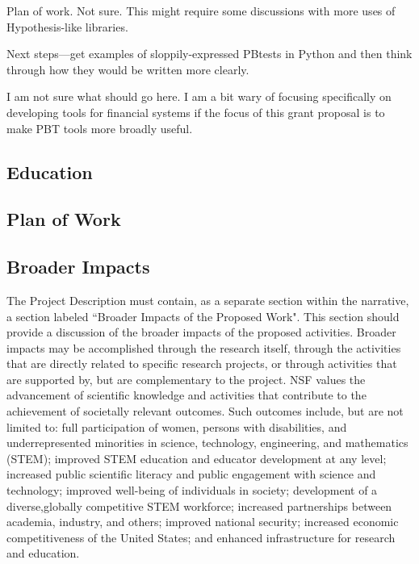 Plan of work. Not sure. This might require some discussions with more uses of Hypothesis-like libraries.

Next steps—get examples of sloppily-expressed PBtests in Python and then think through how they would be written more clearly.




I am not sure what should go here. I am a bit wary of focusing specifically on developing tools for financial systems if the focus of this grant proposal is to make PBT tools more broadly useful.

\subsection{Education }

\subsection{Plan of Work }

\subsection{Broader Impacts }
The Project Description must contain, as a separate section within the narrative, a section labeled ``Broader
Impacts of the Proposed Work". This section should provide a discussion of the broader impacts of the proposed
activities. Broader impacts may be accomplished through the research itself, through the activities that are
directly related to specific research projects, or through activities that are supported by, but are complementary to
the project. NSF values the advancement of scientific knowledge and activities that contribute to the
achievement of societally relevant outcomes. Such outcomes include, but are not limited to: full
participation of women, persons with disabilities, and underrepresented minorities in science, technology, engineering, and
mathematics (STEM); improved STEM education and educator development at any level; increased public
scientific literacy and public engagement with science and technology; improved well-being of individuals in
society; development of a diverse,globally competitive STEM workforce; increased partnerships between
academia, industry, and others; improved national security; increased economic competitiveness of the United
States; and enhanced infrastructure for research and education.


